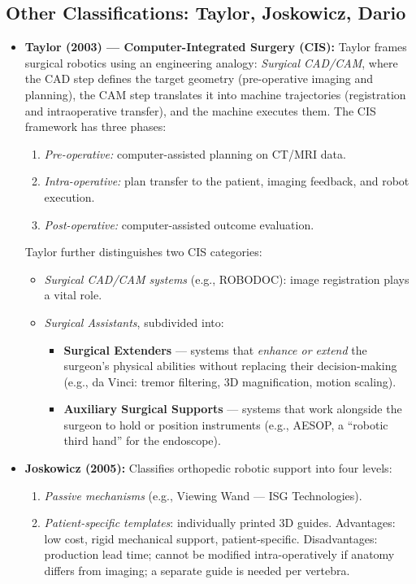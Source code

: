 \documentclass[11pt,a4paper,twoside]{report}
\begin{document}
\subsection{Other Classifications: Taylor, Joskowicz, Dario}
\begin{itemize}
    \item \textbf{Taylor (2003) — Computer-Integrated Surgery (CIS):} Taylor frames surgical robotics using an engineering analogy: \textit{Surgical CAD/CAM}, where the CAD step defines the target geometry (pre-operative imaging and planning), the CAM step translates it into machine trajectories (registration and intraoperative transfer), and the machine executes them. The CIS framework has three phases:
    \begin{enumerate}
        \item \textit{Pre-operative:} computer-assisted planning on CT/MRI data.
        \item \textit{Intra-operative:} plan transfer to the patient, imaging feedback, and robot execution.
        \item \textit{Post-operative:} computer-assisted outcome evaluation.
    \end{enumerate}
    Taylor further distinguishes two CIS categories:
    \begin{itemize}
        \item \textit{Surgical CAD/CAM systems} (e.g., ROBODOC): image registration plays a vital role.
        \item \textit{Surgical Assistants}, subdivided into:
        \begin{itemize}
            \item \textbf{Surgical Extenders} — systems that \textit{enhance or extend} the surgeon's physical abilities without replacing their decision-making (e.g., da Vinci: tremor filtering, 3D magnification, motion scaling).
            \item \textbf{Auxiliary Surgical Supports} — systems that work alongside the surgeon to hold or position instruments (e.g., AESOP, a ``robotic third hand'' for the endoscope).
        \end{itemize}
    \end{itemize}
    \item \textbf{Joskowicz (2005):} Classifies orthopedic robotic support into four levels:
    \begin{enumerate}
        \item \textit{Passive mechanisms} (e.g., Viewing Wand — ISG Technologies).
        \item \textit{Patient-specific templates}: individually printed 3D guides. Advantages: low cost, rigid mechanical support, patient-specific. Disadvantages: production lead time; cannot be modified intra-operatively if anatomy differs from imaging; a separate guide is needed per vertebra.

\end{enumerate}
\end{itemize}
\end{document}
